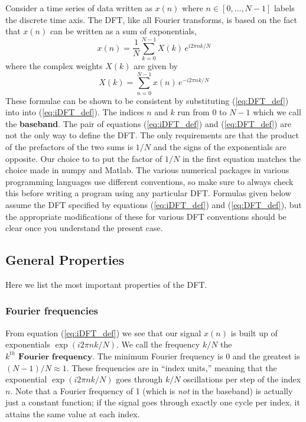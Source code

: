 \documentclass[twocolumn]{article}
\begin{document}
Consider a time series of data written as $x(n)$ where $n \in [0,\dots,N-1]$ labels the discrete time axis.
The DFT, like all Fourier transforms, is based on the fact that $x(n)$ can be written as a sum of exponentials,
\begin{equation}
x(n)=\frac{1}{N}\sum_{k=0}^{N-1}X(k)\, e^{i2\pi nk/N} \label{eq:iDFT_def}
\end{equation}
where the complex weights $X(k)$ are given by
\begin{equation}
X(k)=\sum_{n=0}^{N-1}x(n)\, e^{-i2\pi nk/N} \label{eq:DFT_def}
\end{equation}
These formulae can be shown to be consistent by substituting (\ref{eq:DFT_def}) into  into (\ref{eq:iDFT_def}).
The indices $n$ and $k$ run from $0$ to $N-1$ which we call the \textbf{baseband}.
The pair of equations (\ref{eq:iDFT_def}) and (\ref{eq:DFT_def}) are not the only way to define the DFT.
The only requirements are that the product of the prefactors of the two sums is $1/N$ and the signs of the exponentials are opposite.
Our choice to to put the factor of $1/N$ in the first equation matches the choice made in numpy and Matlab.
The various numerical packages in various programming languages use different conventions, so make sure to always check this before writing a program using any particular DFT.
Formulas given below assume the DFT specified by equations (\ref{eq:iDFT_def}) and (\ref{eq:DFT_def}), but the appropriate modifications of these for various DFT conventions should be clear once you understand the present case.


\subsection{General Properties}

Here we list the most important properties of the DFT. 

\subsubsection{Fourier frequencies}

From equation (\ref{eq:iDFT_def}) we see that our signal $x(n)$ is built up of exponentials $\exp(i2\pi nk/N)$.
We call the frequency $k/N$ the $k^{th}\textbf{ Fourier frequency}$.
The minimum Fourier frequency is 0 and the greatest is $(N-1)/N\approx1$.
These frequencies are in ``index units,'' meaning that the exponential $\exp(i 2 \pi n k / N)$ goes through $k/N$ oscillations per step of the index $n$.
Note that a Fourier frequency of 1 (which is \emph{not} in the baseband) is actually just a constant function; if the signal goes through exactly one cycle per index, it attains the same value at each index.
\end{document}
